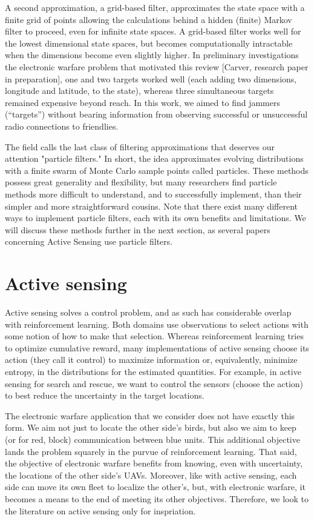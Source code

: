 \documentclass{article}
\begin{document}
A second approximation, a grid-based filter, approximates the state
space with a finite grid of points allowing the calculations behind a
hidden (finite) Markov filter to proceed, even for infinite state
spaces.  A grid-based filter works well for the lowest dimensional
state spaces, but becomes computationally intractable when the
dimensions become even slightly higher.  In preliminary investigations
the electronic warfare problem that motivated this review [Carver,
research paper in preparation], one and two targets worked well (each
adding two dimensions, longitude and latitude, to the state), whereas
three simultaneous targets remained expensive beyond reach.  In this
work, we aimed to find jammers (``targets'') without bearing
information from observing successful or unsuccessful radio
connections to friendlies.

The field calls the last class of filtering approximations that
deserves our attention "particle filters."  In short, the idea
approximates evolving distributions with a finite swarm of Monte Carlo
sample points called particles.  These methods possess great
generality and flexibility, but many researchers find particle methods
more difficult to understand, and to successfully implement, than
their simpler and more straightforward cousins.  Note that there exist
many different ways to implement particle filters, each with its own
benefits and limitations.  We will discuss these methods further in
the next section, as several papers concerning Active Sensing use
particle filters.

\section{Active sensing}

Active sensing solves a control problem, and as such has considerable
overlap with reinforcement learning.  Both domains use observations to
select actions with some notion of how to make that selection.
Whereas reinforcement learning tries to optimize cumulative reward,
many implementations of active sensing choose its action (they call it
control) to maximize information or, equivalently, minimize entropy,
in the distributions for the estimated quantities.  For example, in
active sensing for search and rescue, we want to control the sensors
(choose the action) to best reduce the uncertainty in the target
locations.

The electronic warfare application that we consider does not have
exactly this form.  We aim not just to locate the other side's birds,
but also we aim to keep (or for red, block) communication between blue
units.  This additional objective lands the problem squarely in the
purvue of reinforcement learning.  That said, the objective of
electronic warfare benefits from knowing, even with uncertainty, the
locations of the other side's UAVs.  Moreover, like with active
sensing, each side can move its own fleet to localize the other's, but,
with electronic warfare, it becomes a means to the end of meeting its
other objectives.  Therefore, we look to the literature on active
sensing only for inspriation.
\end{document}
